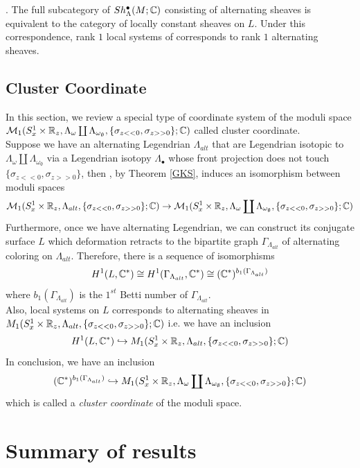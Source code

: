 \begin{theorem}
\cite[Thm.~4.16]{shende2019cluster}\cite[Cor.~4.17]{shende2019cluster}. The full subcategory of $Sh^\bullet_\Lambda(M;\mathbb{C})$ consisting of alternating sheaves is equivalent to the category of locally constant sheaves on $L$. Under this correspondence, rank $1$ local systems of corresponds to rank $1$ alternating sheaves.
\end{theorem}

\subsection*{Cluster Coordinate}
In this section, we review a special type of coordinate system of the moduli space $\mathcal{M}_1(S^1_x\times \mathbb{R}_z,\Lambda_\omega \coprod \Lambda_{\omega_\emptyset},\{\sigma_{z<<0},\sigma_{z>>0}\};\mathbb{C})$ called cluster coordinate.\\
Suppose we have an alternating Legendrian $\Lambda_{alt}$ that are Legendrian isotopic to $\Lambda_{\omega}\coprod \Lambda_{\omega_\emptyset}$ via a Legendrian isotopy $\Lambda_{\bullet}$ whose front projection does not touch $\{\sigma_{z<<0},\sigma_{z>>0}\}$, then , by Theorem \ref{GKS}, induces an isomorphism between moduli spaces
\[
\mathcal{M}_1(S^1_x\times \mathbb{R}_z,\Lambda_{alt},\{\sigma_{z<<0},\sigma_{z>>0}\};\mathbb{C}) \overset{~}{\rightarrow}\mathcal{M}_1(S^1_x\times \mathbb{R}_z,\Lambda_\omega \coprod \Lambda_{\omega_\emptyset},\{\sigma_{z<<0},\sigma_{z>>0}\};\mathbb{C})
\]
Furthermore, once we have alternating Legendrian, we can construct its conjugate surface $L$ which deformation retracts to the bipartite graph $\Gamma_{\Lambda_{alt}}$ of alternating coloring on $\Lambda_{alt}$. Therefore, there is a sequence of isomorphisms
\[
H^1(L,\mathbb{C}^*) \cong H^1(\Gamma_{\Lambda_{alt}},\mathbb{C}^*) \cong (\mathbb{C}^*)^{b_1(\Gamma_{\Lambda_{alt}})}
\]
where $b_1(\Gamma_{\Lambda_{alt}})$ is the $1^{st}$ Betti number of $\Gamma_{\Lambda_{alt}}$.\\
Also, local systems on $L$ corresponds to alternating sheaves in $M_1(S^1_x\times \mathbb{R}_z, \Lambda_{alt},\{\sigma_{z<<0},\sigma_{z>>0}\};\mathbb{C})$ i.e. we have an inclusion
\[
H^1(L,\mathbb{C}^*)\hookrightarrow M_1(S^1_x\times \mathbb{R}_z, \Lambda_{alt},\{\sigma_{z<<0},\sigma_{z>>0}\};\mathbb{C})
\]
In conclusion, we have an inclusion
\[
(\mathbb{C}^*)^{b_1(\Gamma_{\Lambda_{alt}})}\hookrightarrow M_1(S^1_x\times \mathbb{R}_z, \Lambda_{\omega}\coprod \Lambda_{\omega_{\emptyset}},\{\sigma_{z<<0},\sigma_{z>>0}\};\mathbb{C})
\]
which is called a \emph{cluster coordinate} of the moduli space.\\
\section{Summary of results}\label{sec_summary_of_results}

